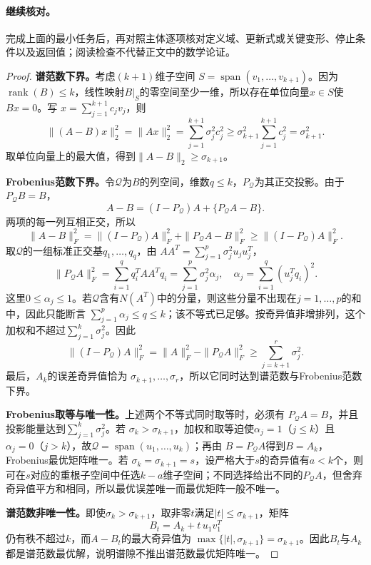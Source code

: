 \paragraph{继续核对。}完成上面的最小任务后，再对照主体逐项核对定义域、更新式或关键变形、停止条件以及返回值；阅读检查不代替正文中的数学论证。

\begin{proof}
\textbf{谱范数下界。}考虑$(k+1)$维子空间
$S=\operatorname{span}(v_1,\ldots,v_{k+1})$。因为
$\operatorname{rank}(B)\leq k$，线性映射$B|_S$的零空间至少一维，所以存在单位向量$x\in S$使$Bx=0$。写
$x=\sum_{j=1}^{k+1}c_jv_j$，则
\[
\|(A-B)x\|_2^2=\|Ax\|_2^2
=\sum_{j=1}^{k+1}\sigma_j^2c_j^2
\geq\sigma_{k+1}^2\sum_{j=1}^{k+1}c_j^2
=\sigma_{k+1}^2.
\]
取单位向量上的最大值，得到$\|A-B\|_2\geq\sigma_{k+1}$。

\textbf{Frobenius范数下界。}令$\mathcal Q$为$B$的列空间，维数$q\leq k$，$P_{\mathcal Q}$为其正交投影。由于$P_{\mathcal Q}B=B$，
\[
A-B=(I-P_{\mathcal Q})A+\{P_{\mathcal Q}A-B\}.
\]
两项的每一列互相正交，所以
\[
\|A-B\|_F^2
=\|(I-P_{\mathcal Q})A\|_F^2
+\|P_{\mathcal Q}A-B\|_F^2
\geq\|(I-P_{\mathcal Q})A\|_F^2.
\]
取$\mathcal Q$的一组标准正交基$q_1,\ldots,q_q$，由
$AA^T=\sum_{j=1}^{p}\sigma_j^2u_ju_j^T$，
\[
\|P_{\mathcal Q}A\|_F^2
=\sum_{i=1}^{q}q_i^TAA^Tq_i
=\sum_{j=1}^{p}\sigma_j^2\alpha_j,
\quad
\alpha_j=\sum_{i=1}^{q}(u_j^Tq_i)^2.
\]
这里$0\leq\alpha_j\leq1$。若$\mathcal Q$含有$N(A^T)$中的分量，则这些分量不出现在$j=1,\ldots,p$的和中，因此只能断言
$\sum_{j=1}^{p}\alpha_j\leq q\leq k$；该不等式已足够。按奇异值非增排列，这个加权和不超过$\sum_{j=1}^{k}\sigma_j^2$。因此
\[
\|(I-P_{\mathcal Q})A\|_F^2
=\|A\|_F^2-\|P_{\mathcal Q}A\|_F^2
\geq\sum_{j=k+1}^{r}\sigma_j^2.
\]
最后，$A_k$的误差奇异值恰为
$\sigma_{k+1},\ldots,\sigma_r$，所以它同时达到谱范数与Frobenius范数下界。

\textbf{Frobenius取等与唯一性。}上述两个不等式同时取等时，必须有
$P_{\mathcal Q}A=B$，并且投影能量达到$\sum_{j=1}^k\sigma_j^2$。若
$\sigma_k>\sigma_{k+1}$，加权和取等迫使$\alpha_j=1$（$j\leq k$）且
$\alpha_j=0$（$j>k$），故$\mathcal Q=\operatorname{span}(u_1,\ldots,u_k)$；再由
$B=P_{\mathcal Q}A$得到$B=A_k$，Frobenius最优矩阵唯一。若
$\sigma_k=\sigma_{k+1}=s$，设严格大于$s$的奇异值有$a<k$个，则可在$s$对应的重根子空间中任选$k-a$维子空间；不同选择给出不同的$P_{\mathcal Q}A$，但舍弃奇异值平方和相同，所以最优误差唯一而最优矩阵一般不唯一。

\textbf{谱范数非唯一性。}即使$\sigma_k>\sigma_{k+1}$，取非零$t$满足$|t|\leq\sigma_{k+1}$，矩阵
\[
B_t=A_k+t\,u_1v_1^T
\]
仍有秩不超过$k$，而$A-B_t$的最大奇异值为
$\max\{|t|,\sigma_{k+1}\}=\sigma_{k+1}$。因此$B_t$与$A_k$都是谱范数最优解，说明谱隙不推出谱范数最优矩阵唯一。
\end{proof}

